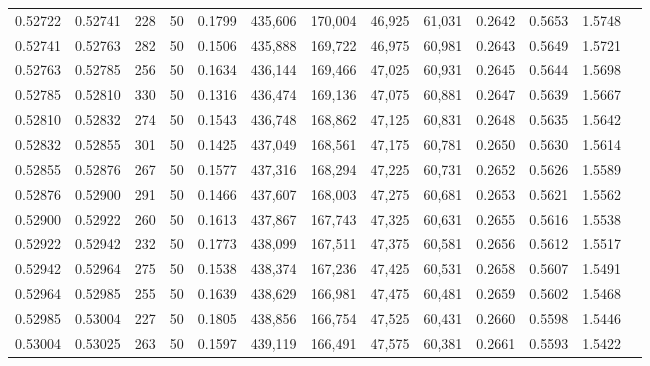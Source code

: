 \begin{tabular}{rrrrrrrrrrrrr}
0.52722 & 0.52741 &   228 &  50 &                                     0.1799 & 435,606 & 170,004 &  46,925 &  61,031 & 0.2642 & 0.5653 & 1.5748 \\
0.52741 & 0.52763 &   282 &  50 &                                     0.1506 & 435,888 & 169,722 &  46,975 &  60,981 & 0.2643 & 0.5649 & 1.5721 \\
0.52763 & 0.52785 &   256 &  50 &                                     0.1634 & 436,144 & 169,466 &  47,025 &  60,931 & 0.2645 & 0.5644 & 1.5698 \\
0.52785 & 0.52810 &   330 &  50 &                                     0.1316 & 436,474 & 169,136 &  47,075 &  60,881 & 0.2647 & 0.5639 & 1.5667 \\
0.52810 & 0.52832 &   274 &  50 &                                     0.1543 & 436,748 & 168,862 &  47,125 &  60,831 & 0.2648 & 0.5635 & 1.5642 \\
0.52832 & 0.52855 &   301 &  50 &                                     0.1425 & 437,049 & 168,561 &  47,175 &  60,781 & 0.2650 & 0.5630 & 1.5614 \\
0.52855 & 0.52876 &   267 &  50 &                                     0.1577 & 437,316 & 168,294 &  47,225 &  60,731 & 0.2652 & 0.5626 & 1.5589 \\
0.52876 & 0.52900 &   291 &  50 &                                     0.1466 & 437,607 & 168,003 &  47,275 &  60,681 & 0.2653 & 0.5621 & 1.5562 \\
0.52900 & 0.52922 &   260 &  50 &                                     0.1613 & 437,867 & 167,743 &  47,325 &  60,631 & 0.2655 & 0.5616 & 1.5538 \\
0.52922 & 0.52942 &   232 &  50 &                                     0.1773 & 438,099 & 167,511 &  47,375 &  60,581 & 0.2656 & 0.5612 & 1.5517 \\
0.52942 & 0.52964 &   275 &  50 &                                     0.1538 & 438,374 & 167,236 &  47,425 &  60,531 & 0.2658 & 0.5607 & 1.5491 \\
0.52964 & 0.52985 &   255 &  50 &                                     0.1639 & 438,629 & 166,981 &  47,475 &  60,481 & 0.2659 & 0.5602 & 1.5468 \\
0.52985 & 0.53004 &   227 &  50 &                                     0.1805 & 438,856 & 166,754 &  47,525 &  60,431 & 0.2660 & 0.5598 & 1.5446 \\
0.53004 & 0.53025 &   263 &  50 &                                     0.1597 & 439,119 & 166,491 &  47,575 &  60,381 & 0.2661 & 0.5593 & 1.5422 \\

\end{tabular}
